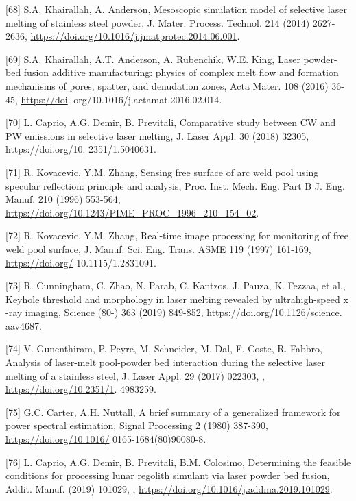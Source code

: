 \documentclass[10pt]{article}
\begin{document}
[68] S.A. Khairallah, A. Anderson, Mesoscopic simulation model of selective laser melting of stainless steel powder, J. Mater. Process. Technol. 214 (2014) 2627-2636, \href{https://doi.org/10.1016/j.jmatprotec.2014.06.001}{https://doi.org/10.1016/j.jmatprotec.2014.06.001}.

[69] S.A. Khairallah, A.T. Anderson, A. Rubenchik, W.E. King, Laser powder-bed fusion additive manufacturing: physics of complex melt flow and formation mechanisms of pores, spatter, and denudation zones, Acta Mater. 108 (2016) 36-45, \href{https://doi}{https://doi}. org/10.1016/j.actamat.2016.02.014.

[70] L. Caprio, A.G. Demir, B. Previtali, Comparative study between CW and PW emissions in selective laser melting, J. Laser Appl. 30 (2018) 32305, \href{https://doi.org/10}{https://doi.org/10}. 2351/1.5040631.

[71] R. Kovacevic, Y.M. Zhang, Sensing free surface of arc weld pool using specular reflection: principle and analysis, Proc. Inst. Mech. Eng. Part B J. Eng. Manuf. 210 (1996) 553-564, \href{https://doi.org/10.1243/PIME_PROC_1996_210_154_02}{https://doi.org/10.1243/PIME\_PROC\_1996\_210\_154\_02}.

[72] R. Kovacevic, Y.M. Zhang, Real-time image processing for monitoring of free weld pool surface, J. Manuf. Sci. Eng. Trans. ASME 119 (1997) 161-169, \href{https://doi.org/}{https://doi.org/} 10.1115/1.2831091.

[73] R. Cunningham, C. Zhao, N. Parab, C. Kantzos, J. Pauza, K. Fezzaa, et al., Keyhole threshold and morphology in laser melting revealed by ultrahigh-speed $\mathrm{x}$-ray imaging, Science (80-) 363 (2019) 849-852, \href{https://doi.org/10.1126/science}{https://doi.org/10.1126/science}. aav4687.

[74] V. Gunenthiram, P. Peyre, M. Schneider, M. Dal, F. Coste, R. Fabbro, Analysis of laser-melt pool-powder bed interaction during the selective laser melting of a stainless steel, J. Laser Appl. 29 (2017) 022303, , \href{https://doi.org/10.2351/1}{https://doi.org/10.2351/1}. 4983259.

[75] G.C. Carter, A.H. Nuttall, A brief summary of a generalized framework for power spectral estimation, Signal Processing 2 (1980) 387-390, \href{https://doi.org/10.1016/}{https://doi.org/10.1016/} 0165-1684(80)90080-8.

[76] L. Caprio, A.G. Demir, B. Previtali, B.M. Colosimo, Determining the feasible conditions for processing lunar regolith simulant via laser powder bed fusion, Addit. Manuf. (2019) 101029, , \href{https://doi.org/10.1016/j.addma.2019.101029}{https://doi.org/10.1016/j.addma.2019.101029}.
\end{document}
